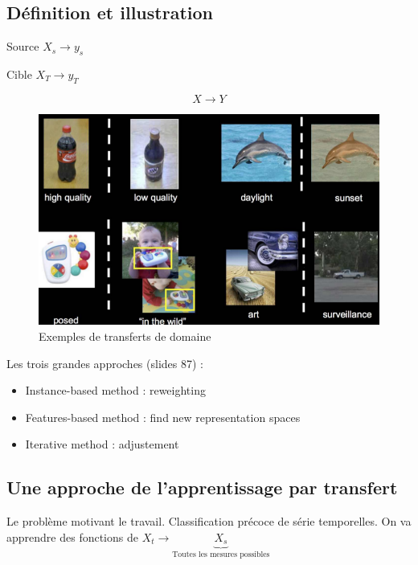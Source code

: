 \documentclass{article}
\begin{document}
\subsection{Définition et illustration}

\begin{center} Source $X_s \rightarrow y_s $ \end{center}
\begin{center} Cible $X_T \rightarrow y_T $ \end{center}
$$ X \rightarrow Y $$

\begin{figure}[H]
  \centering
  \includegraphics[scale=0.4]{domain_transfer.png}
  \caption{Exemples de transferts de domaine}
\end{figure}

Les trois grandes approches (slides 87) :

\begin{itemize}
\item Instance-based method : reweighting
\item Features-based method : find new representation spaces
\item Iterative method : adjustement
\end{itemize}

\subsection{Une approche de l'apprentissage par transfert}

Le problème motivant le travail.
Classification précoce de série temporelles.
On va apprendre des fonctions de $ X_t \rightarrow \underbrace{X_s}_{\text{Toutes les mesures possibles}} $
\end{document}
